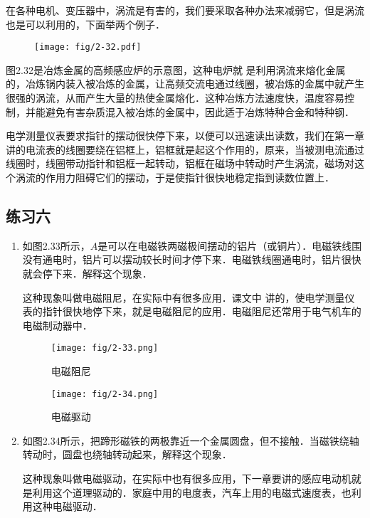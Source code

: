 在各种电机、变压器中，涡流是有害的，我们要采取各种办法来减弱它，但是涡流也是可以利用的，下面举两个例子．

\begin{figure}[htp]
    \centering
    \texttt{[image: fig/2-32.pdf]}
    \caption{}
\end{figure}

图2.32是冶炼金属的高频感应炉的示意图，这种电炉就
是利用涡流来熔化金属的，冶炼锅内装入被冶炼的金属，让高频交流电通过线圈，被冶炼的金属中就产生很强的涡流，从而产生大量的热使金属熔化．这种冶炼方法速度快，温度容易控制，并能避免有害杂质混入被冶炼的金属中，因此适于冶炼特种合金和特种钢．

电学测量仪表要求指针的摆动很快停下来，以便可以迅速读出读数，我们在第一章讲的电流表的线圈要绕在铝框上，铝框就是起这个作用的，原来，当被测电流通过线圈时，线圈带动指针和铝框一起转动，铝框在磁场中转动时产生涡流，磁场对这个涡流的作用力阻碍它们的摆动，于是使指针很快地稳定指到读数位置上．

\subsection*{练习六}
\begin{enumerate}
    \item 如图2.33所示，$A$是可以在电磁铁两磁极间摆动的铝片（或铜片）．电磁铁线围没有通电时，铝片可以摆动较长时间才停下来．电磁铁线圈通电时，铝片很快就会停下来．解释这个现象．
    
这种现象叫做电磁阻尼，在实际中有很多应用．课文中
讲的，使电学测量仪表的指针很快地停下来，就是电磁阻尼的应用．电磁阻尼还常用于电气机车的电磁制动器中．
\begin{figure}[htp]
\centering
\begin{minipage}[t]{0.48\textwidth}
\centering
\texttt{[image: fig/2-33.png]}
\caption{电磁阻尼}
\end{minipage}
\begin{minipage}[t]{0.48\textwidth}
\centering
\texttt{[image: fig/2-34.png]}
\caption{电磁驱动}
\end{minipage}
\end{figure}
\item 如图2.34所示，把蹄形磁铁的两极靠近一个金属圆盘，但不接触．当磁铁绕轴转动时，圆盘也绕轴转动起来，解释这个现象．

这种现象叫做电磁驱动，在实际中也有很多应用，下一章要讲的感应电动机就是利用这个道理驱动的．家庭中用的电度表，汽车上用的电磁式速度表，也利用这种电磁驱动．
\end{enumerate}

